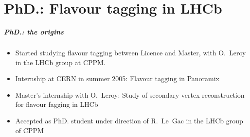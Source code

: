 \documentclass{beamer}
\begin{document}
\part{PhD.: Flavour tagging in LHCb}
\begin{frame}
\partpage
\end{frame}
\begin{frame}
\frametitle{PhD.: the origins}
\begin{itemize}
  \item Started studying \alert{flavour tagging} between Licence and Master,
  with O.~Leroy in the {\color{blue} LHCb group at CPPM}.
  \item Internship at \alert{CERN in summer 2005}: Flavour tagging in Panoramix
  \item Master's {\color{blue} internship with O.~Leroy}: Study of secondary
  vertex reconstruction for flavour fagging in LHCb
  \item \alert{Accepted as PhD. student} under direction of R.~Le~Gac in the
  LHCb group of CPPM
\end{itemize}
\end{frame}
\end{document}
